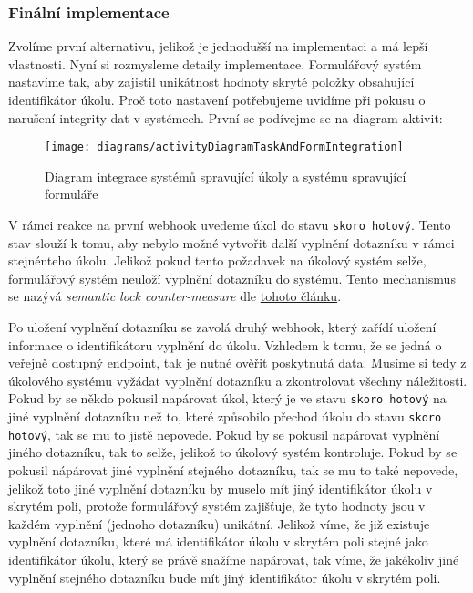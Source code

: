 \subsubsection{Finální implementace}\label{subsubsec:finalni-implementace}

Zvolíme první alternativu, jelikož je jednodušší na implementaci a má lepší vlastnosti.
Nyní si rozmysleme detaily implementace.
Formulářový systém nastavíme tak, aby zajistil unikátnost hodnoty skryté položky obsahující identifikátor úkolu.
Proč toto nastavení potřebujeme uvidíme při pokusu o narušení integrity dat v systémech.
První se podívejme se na diagram aktivit:

\begin{figure}[H]
    \centering
    \texttt{[image: diagrams/activityDiagramTaskAndFormIntegration]}
    \caption{Diagram integrace systémů spravující úkoly a systému spravující formuláře}\label{fig:activity-diagram-task-and-form-integration}
\end{figure}


V rámci reakce na první webhook uvedeme úkol do stavu \texttt{skoro hotový}.
Tento stav slouží k tomu, aby nebylo možné vytvořit další vyplnění dotazníku v rámci stejnénteho úkolu.
Jelikož pokud tento požadavek na úkolový systém selže, formulářový systém neuloží vyplnění dotazníku do systému.
Tento mechanismus se nazývá \emph{semantic lock counter-measure} dle \href{https://microservices.io/post/microservices/2019/07/09/developing-sagas-part-1.html}{tohoto článku}.

Po uložení vyplnění dotazníku se zavolá druhý webhook, který zařídí uložení informace o identifikátoru vyplnění do úkolu.
Vzhledem k tomu, že se jedná o veřejně dostupný endpoint, tak je nutné ověřit poskytnutá data.
Musíme si tedy z úkolového systému vyžádat vyplnění dotazníku a zkontrolovat všechny náležitosti.
Pokud by se někdo pokusil napárovat úkol, který je ve stavu \texttt{skoro hotový} na jiné vyplnění dotazníku než to, které způsobilo přechod úkolu do stavu \texttt{skoro hotový}, tak se mu to jistě nepovede.
Pokud by se pokusil napárovat vyplnění jiného dotazníku, tak to selže, jelikož to úkolový systém kontroluje.
Pokud by se pokusil nápárovat jiné vyplnění stejného dotazníku, tak se mu to také nepovede, jelikož toto jiné vyplnění dotazníku by muselo mít jiný identifikátor úkolu v skrytém poli, protože formulářový systém zajišťuje, že tyto hodnoty jsou v každém vyplnění (jednoho dotazníku) unikátní.
Jelikož víme, že již existuje vyplnění dotazníku, které má identifikátor úkolu v skrytém poli stejné jako identifikátor úkolu, který se právě snažíme napárovat, tak víme, že jakékoliv jiné vyplnění stejného dotazníku bude mít jiný identifikátor úkolu v skrytém poli.

